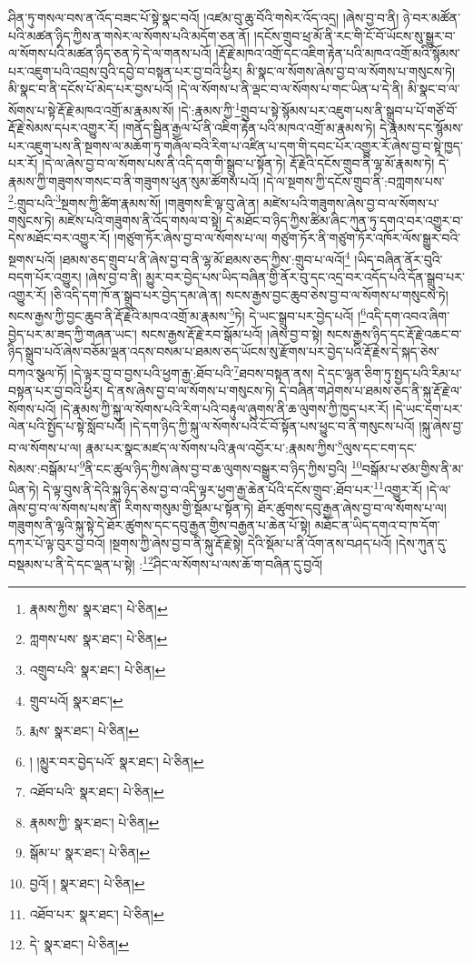 ཤིན་ཏུ་གསལ་བས་ན་འོད་བཟང་པོ་སྟེ་སྣང་བའོ། །འཛམ་བུ་ཆུ་བོའི་གསེར་འོད་འདྲ། །ཞེས་བྱ་བ་ནི། ཉེ་བར་མཚོན་པའི་མཚན་ཉིད་ཀྱིས་ན་གསེར་ལ་སོགས་པའི་མདོག་ཅན་ནོ། །དངོས་གྲུབ་ཕྲ་མོ་ནི་རང་གི་ངོ་བོ་ཡོངས་སུ་སྒྱུར་བ་ལ་སོགས་པའི་མཚན་ཉིད་ཅན་ཏེ་དེ་ལ་གནས་པའོ། །རྡོ་རྗེ་མཁའ་འགྲོ་དང་འཇིག་རྟེན་པའི་མཁའ་འགྲོ་མའི་སྙོམས་པར་འཇུག་པའི་འབྲས་བུའི་དབྱེ་བ་བསྟན་པར་བྱ་བའི་ཕྱིར། མི་སྣང་ལ་སོགས་ཞེས་བྱ་བ་ལ་སོགས་པ་གསུངས་ཏེ། མི་སྣང་བ་ནི་དངོས་པོ་མེད་པར་བྱས་པའོ། །དེ་ལ་སོགས་པ་ནི་ལྡང་བ་ལ་སོགས་པ་གང་ཡིན་པ་དེ་ནི། མི་སྣང་བ་ལ་སོགས་པ་སྟེ་རྡོ་རྗེ་མཁའ་འགྲོ་མ་རྣམས་སོ། །དེ་:རྣམས་ཀྱི་\footnote{རྣམས་ཀྱིས་  སྣར་ཐང་།  པེ་ཅིན། }གྲུབ་པ་སྟེ་སྙོམས་པར་འཇུག་པས་ནི་སྒྲུབ་པ་པོ་གཙོ་བོ་རྡོ་རྗེ་སེམས་དཔར་འགྱུར་རོ། །གནོད་སྦྱིན་རྒྱལ་པོ་ནི་འཇིག་རྟེན་པའི་མཁའ་འགྲོ་མ་རྣམས་ཏེ། དེ་རྣམས་དང་སྙོམས་པར་འཇུག་པས་ནི་སྔགས་ལ་མཆོག་ཏུ་གཞོལ་བའི་རིག་པ་འཛིན་པ་དག་གི་དབང་པོར་འགྱུར་རོ་ཞེས་བྱ་བ་སྟེ་ཁྱད་པར་རོ། །དེ་ལ་ཞེས་བྱ་བ་ལ་སོགས་པས་ནི་འདི་དག་གི་སྒྲུབ་པ་སྟོན་ཏེ། རྡོ་རྗེའི་དངོས་གྲུབ་ནི་ལྷ་མོ་རྣམས་ཏེ། དེ་རྣམས་ཀྱི་གཟུགས་གསང་བ་ནི་གཟུགས་ཕུན་སུམ་ཚོགས་པའོ། །དེ་ལ་སྔགས་ཀྱི་དངོས་གྲུབ་ནི་:བཀླགས་པས་\footnote{ཀླགས་པས་  སྣར་ཐང་།  པེ་ཅིན། }:གྲུབ་པའི་\footnote{འགྲུབ་པའི་  སྣར་ཐང་།  པེ་ཅིན། }སྔགས་ཀྱི་ཚིག་རྣམས་སོ། །གཟུགས་ཇི་ལྟ་བུ་ཞེ་ན། མཛེས་པའི་གཟུགས་ཞེས་བྱ་བ་ལ་སོགས་པ་གསུངས་ཏེ། མཛེས་པའི་གཟུགས་ནི་འོད་གསལ་བ་སྟེ། དེ་མཐོང་བ་ཉིད་ཀྱིས་ཚིམ་ཞིང་ཀུན་ཏུ་དགའ་བར་འགྱུར་བ་དེས་མཐོང་བར་འགྱུར་རོ། །གཙུག་ཏོར་ཞེས་བྱ་བ་ལ་སོགས་པ་ལ། གཙུག་ཏོར་ནི་གཙུག་ཏོར་འཁོར་ལོས་སྒྱུར་བའི་སྔགས་པའོ། །ཐམས་ཅད་གྲུབ་པ་ནི་ཞེས་བྱ་བ་ནི་ལྷ་མོ་ཐམས་ཅད་ཀྱིས་:གྲུབ་པ་ལའོ།\footnote{གྲུབ་པའོ།  སྣར་ཐང་། } །ཡིད་བཞིན་ནོར་བུའི་བདག་པོར་འགྱུར། །ཞེས་བྱ་བ་ནི། མྱུར་བར་བྱེད་པས་ཡིད་བཞིན་གྱི་ནོར་བུ་དང་འདྲ་བར་འདོད་པའི་དོན་སྒྲུབ་པར་འགྱུར་རོ། །ཅི་འདི་དག་ཁོ་ན་སྒྲུབ་པར་བྱེད་དམ་ཞེ་ན། སངས་རྒྱས་བྱང་ཆུབ་ཅེས་བྱ་བ་ལ་སོགས་པ་གསུངས་ཏེ། སངས་རྒྱས་ཀྱི་བྱང་ཆུབ་ནི་རྡོ་རྗེའི་མཁའ་འགྲོ་མ་རྣམས་\footnote{རྨས་  སྣར་ཐང་།  པེ་ཅིན། }ཏེ། དེ་ཡང་སྒྲུབ་པར་བྱེད་པའོ། །\footnote{། །མྱུར་བར་བྱེད་པའོ་  སྣར་ཐང་།  པེ་ཅིན། }འདི་དག་འབའ་ཞིག་བྱེད་པར་མ་ཟད་ཀྱི་གཞན་ཡང་། སངས་རྒྱས་རྡོ་རྗེ་རབ་སྒོམ་པའོ། །ཞེས་བྱ་བ་སྟེ། སངས་རྒྱས་ཉིད་དང་རྡོ་རྗེ་འཆང་བ་ཉིད་སྒྲུབ་པའོ་ཞེས་བཅོམ་ལྡན་འདས་བསམ་པ་ཐམས་ཅད་ཡོངས་སུ་རྫོགས་པར་བྱེད་པའི་རྡོ་རྗེས་དེ་སྐད་ཅེས་བཀའ་སྩལ་ཏོ། །དེ་ལྟར་བྱ་བ་བྱས་པའི་ཕྱག་རྒྱ་:ཐོབ་པའི་\footnote{འཐོབ་པའི་  སྣར་ཐང་།  པེ་ཅིན། }ཐབས་བསྟན་ནས། དེ་དང་ལྷན་ཅིག་ཏུ་སྤྱད་པའི་རིམ་པ་བསྟན་པར་བྱ་བའི་ཕྱིར། དེ་ནས་ཞེས་བྱ་བ་ལ་སོགས་པ་གསུངས་ཏེ། དེ་བཞིན་གཤེགས་པ་ཐམས་ཅད་ནི་སྐུ་རྡོ་རྗེ་ལ་སོགས་པའོ། །དེ་རྣམས་ཀྱི་སྐུ་ལ་སོགས་པའི་རིག་པའི་བརྟུལ་ཞུགས་ནི་ཆ་ལུགས་ཀྱི་ཁྱད་པར་རོ། །དེ་ཡང་དག་པར་ལེན་པའི་སྤྱོད་པ་སྟེ་སློབ་པའོ། །དེ་དག་ཉིད་ཀྱི་སྐུ་ལ་སོགས་པའི་ངོ་བོ་སྟོན་པས་ཕྱུང་བ་ནི་གསུངས་པའོ། །སྐུ་ཞེས་བྱ་བ་ལ་སོགས་པ་ལ། རྣམ་པར་སྣང་མཛད་ལ་སོགས་པའི་རྣལ་འབྱོར་པ་:རྣམས་ཀྱིས་\footnote{རྣམས་ཀྱི་  སྣར་ཐང་།  པེ་ཅིན། }ལུས་དང་ངག་དང་སེམས་:བསྒོམ་པ་\footnote{སྒོམ་པ་  སྣར་ཐང་།  པེ་ཅིན། }ནི་ངང་ཚུལ་ཉིད་ཀྱིས་ཞེས་བྱ་བ་ཆ་ལུགས་བསྒྱུར་བ་ཉིད་ཀྱིས་བྱའི། \footnote{བྱའོ། །   སྣར་ཐང་།  པེ་ཅིན། }བསྒོམ་པ་ཙམ་གྱིས་ནི་མ་ཡིན་ཏེ། དེ་ལྟ་བུས་ནི་དེའི་སྐུ་ཉིད་ཅེས་བྱ་བ་འདི་ལྟར་ཕྱག་རྒྱ་ཆེན་པོའི་དངོས་གྲུབ་:ཐོབ་པར་\footnote{འཐོབ་པར་  སྣར་ཐང་།  པེ་ཅིན། }འགྱུར་རོ། །དེ་ལ་ཞེས་བྱ་བ་ལ་སོགས་པས་ནི། རིགས་གསུམ་གྱི་སྡོམ་པ་སྟོན་ཏེ། ཐོར་ཚུགས་དབུ་རྒྱན་ཞེས་བྱ་བ་ལ་སོགས་པ་ལ། གཟུགས་ནི་ལྷའི་སྐུ་སྟེ་དེ་ཐོར་ཚུགས་དང་དབུ་རྒྱན་གྱིས་བརྒྱན་པ་ཆེན་པོ་སྟེ། མཐོང་ན་ཡིད་དགའ་བ་ཁ་དོག་དཀར་པོ་ལྟ་བུར་བྱ་བའོ། །སྔགས་ཀྱི་ཞེས་བྱ་བ་ནི་སྐུ་རྡོ་རྗེ་སྟེ། དེའི་སྡོམ་པ་ནི་འོག་ནས་བཤད་པའོ། །དེས་ཀུན་དུ་བསྡམས་པ་ནི་དེ་དང་ལྡན་པ་སྟེ། :\footnote{དེ་  སྣར་ཐང་།  པེ་ཅིན། }ཤིང་ལ་སོགས་པ་ལས་ཆོ་ག་བཞིན་དུ་བྱའོ། 
